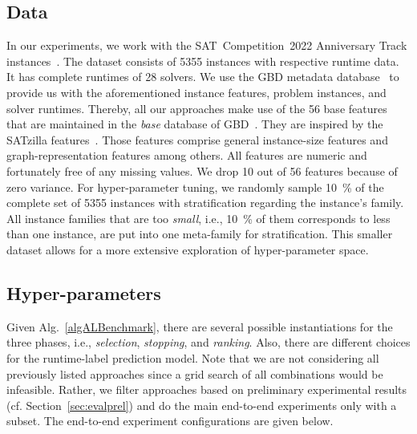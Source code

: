 \documentclass[runningheads]{llncs}
\begin{document}
\subsection{Data}
In our experiments, we work with the SAT~Competition~2022 Anniversary Track instances~\cite{sat2022}.
The dataset consists of 5355 instances with respective runtime data.
It has complete runtimes of 28 solvers.
We use the GBD metadata database~\cite{IserS18} to provide us with the aforementioned instance features, problem instances, and solver runtimes.
Thereby, all our approaches make use of the 56 base features that are maintained in the \emph{base} database of GBD~\cite{IserS18}.
They are inspired by the SATzilla features~\cite{features}.
Those features comprise general instance-size features and graph-representation features among others.
All features are numeric and fortunately free of any missing values.
We drop 10 out of 56 features because of zero variance.
For hyper-parameter tuning, we randomly sample \SI{10}{\%} of the complete set of 5355 instances with stratification regarding the instance's family.
All instance families that are too \emph{small}, i.e., \SI{10}{\%} of them corresponds to less than one instance, are put into one meta-family for stratification.
This smaller dataset allows for a more extensive exploration of hyper-parameter space.

\subsection{Hyper-parameters}
\label{sec:hyper}
Given Alg.~\ref{algALBenchmark}, there are several possible instantiations for the three phases, i.e., \emph{selection}, \emph{stopping}, and \emph{ranking}.
Also, there are different choices for the runtime-label prediction model.
Note that we are not considering all previously listed approaches since a grid search of all combinations would be infeasible.
Rather, we filter approaches based on preliminary experimental results (cf. Section~\ref{sec:evalprel}) and do the main end-to-end experiments only with a subset.
The end-to-end experiment configurations are given below.
\end{document}
